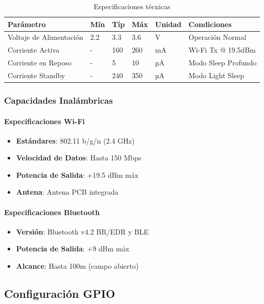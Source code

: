 \documentclass[11pt,a4paper]{article}
\begin{document}
\begin{table}[H]
\centering
\small
\begin{tabular}{|l|l|l|l|l|l|}
\hline
Parámetro & Mín & Típ & Máx & Unidad & Condiciones \\
\hline
Voltaje de Alimentación & 2.2 & 3.3 & 3.6 & V & Operación Normal \\
Corriente Activa & - & 160 & 260 & mA & Wi-Fi Tx @ 19.5dBm \\
Corriente en Reposo & - & 5 & 10 & µA & Modo Sleep Profundo \\
Corriente Standby & - & 240 & 350 & µA & Modo Light Sleep \\
\hline
\end{tabular}
\caption{Especificaciones técnicas}
\end{table}


\subsubsection{Capacidades Inalámbricas}

\paragraph{Especificaciones Wi-Fi}
\begin{itemize}
\item \textbf{Estándares}: 802.11 b/g/n (2.4 GHz)
\item \textbf{Velocidad de Datos}: Hasta 150 Mbps
\item \textbf{Potencia de Salida}: +19.5 dBm máx
\item \textbf{Antena}: Antena PCB integrada
\end{itemize}

\paragraph{Especificaciones Bluetooth}
\begin{itemize}
\item \textbf{Versión}: Bluetooth v4.2 BR/EDR y BLE
\item \textbf{Potencia de Salida}: +9 dBm máx
\item \textbf{Alcance}: Hasta 100m (campo abierto)
\end{itemize}

\subsection{Configuración GPIO}
\end{document}
